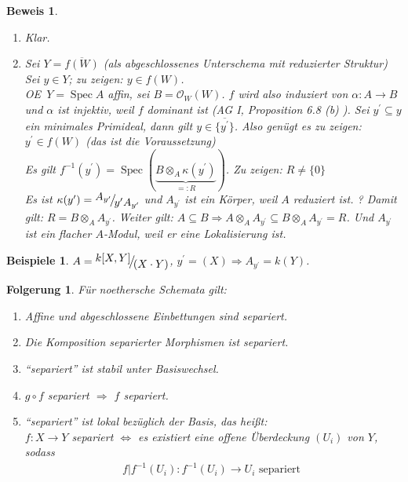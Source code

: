 \documentclass[a4paper,oneside]{scrbook}
\theoremstyle{break}
\newtheorem{Folg}[Def]{Folgerung}
\theoremstyle{nonumberbreak}
\newtheorem{nnBsp}{Beispiele}
\theoremstyle{nonumberplain}
\newtheorem{Bew}{Beweis}
\theoremstyle{break}
\newcommand{\defeql}[0]{=\mathrel{\mathop:}}
\newcommand{\Spec}{%
	\ensuremath{\operatorname{Spec}}%
}
\newcommand{\FakRaum}[2]{
  \raisebox{0.7ex}{\ensuremath{#1}}
  \ensuremath{\mkern-3mu}\big/\ensuremath{\mkern-3mu}
  \raisebox{-0.6ex}{\ensuremath{#2}}}
\renewcommand{\OE}{O\!\!E~}
\begin{document}
\begin{Bew}
  \begin{enumerate}
  \item[``$\Rightarrow$''] Klar.
  \item[``$\Leftarrow$''] Sei $Y=\overline{f(W)}$ (als abgeschlossenes Unterschema mit reduzierter Struktur) \\
    Sei $y\in Y$; zu zeigen: $y\in f(W)$. \\
    \OE $Y=\Spec A$ affin, sei $B=\mathcal O_W(W)$. $f$ wird also induziert von $\alpha:A\to B$ und $\alpha$ ist injektiv, weil $f$ dominant ist
    (AG I, Proposition 6.8 (b) ). Sei $y^\prime\subseteq y$ ein minimales Primideal, dann gilt $y\in\overline{\{y^\prime\}}$.
    Also genügt es zu zeigen: $y^\prime\in f(W)$ (das ist die Voraussetzung) \\
    Es gilt $f^{-1}(y^\prime)=\Spec(\underbrace{B\otimes_A\kappa(y^\prime)}_{\defeql R})$.  Zu zeigen: $R\neq\{0\}$ \\
    Es ist $\kappa(y^\prime)=\FakRaum{A_{y^\prime}}{y^\prime A_{y^\prime}}$ und $A_{y^\prime}$ ist ein Körper, weil $A$ reduziert ist. ?
    Damit gilt: $R=B\otimes_A A_{y^\prime}$. Weiter gilt: $A\subseteq B\Rightarrow A\otimes_A A_{y^\prime}\subseteq B\otimes_A A_{y^\prime}=R$.
    Und $A_{y^\prime}$ ist ein flacher $A$-Modul, weil er eine Lokalisierung ist.
  \end{enumerate}
\end{Bew}

\begin{nnBsp}
  $A=\FakRaum{k[X,Y]}{(X\cdot Y)}$, $y^\prime=(X)\Rightarrow A_{y^\prime}=k(Y)$.
\end{nnBsp}

\begin{Folg}
  \label{folg:7.6}
  Für noethersche Schemata gilt:
  \begin{enumerate}
  \item Affine und abgeschlossene Einbettungen sind separiert.
  \item Die Komposition separierter Morphismen ist separiert.
  \item ``separiert'' ist stabil unter Basiswechsel.
  \item $g\circ f$ separiert $\Rightarrow$ $f$ separiert.
  \item ``separiert'' ist lokal bezüglich der Basis, das heißt: \\ $f:X\to Y$ separiert $\Leftrightarrow$ es existiert 
    eine offene Überdeckung $(U_i)$ von $Y$, sodass 
    \begin{align*}
      f\vert f^{-1}(U_i):f^{-1}(U_i)\to U_i \text{ separiert }
    \end{align*}
  \end{enumerate}
\end{Folg}
\end{document}
